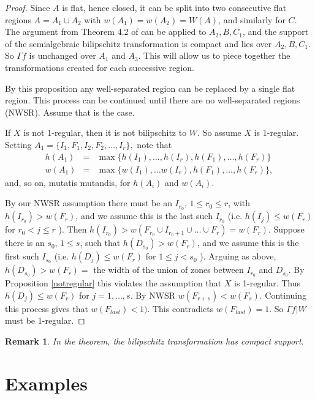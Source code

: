 \documentclass[article]{amsart}
\newtheorem{remark}[theorem]{Remark}
\newcommand{\0}{{\bf 0}}
\begin{document}
\begin{proof}
Since $A$ is flat, hence closed, it can be split into two consecutive flat regions $A=A_1\cup A_2$ with $w(A_1)=w(A_2)=W(A)$, and similarly for $C$. The argument from Theorem 4.2 of \cite{OW1} can be applied to $A_2,B,C_1$, 
and the support of the semialgebraic bilipschitz transformation is compact and lies over $A_2,B,C_1$.  So $\Gamma f$ is unchanged over $A_1$ and $A_3$.  This will allow us to piece together the transformations created for each successive region.


By this proposition any well-separated region can be replaced by a single flat region.  This process can be continued until  there are no well-separated regions (NWSR).  Assume that is the case.

If $X$ is  not 1-regular, then it is not bilipschitz to $W$.  So assume $X$ is 1-regular.  
Setting $A_1 = \{ I_1, F_1, I_2, F_2, \ldots, I_r\},$ note that 
\begin{eqnarray*}
h(A_1) &=& \max\{h(I_1), \ldots, h(I_r), h(F_1), \ldots, h(F_r)\}\\
w(A_1) &=& \max\{w(I_1), \ldots w(I_r), h(F_1), \ldots, h(F_r)\},
\end{eqnarray*} 
and, so on, mutatis mutandis, for $h(A_i)$ and $w(A_i)$.  

By our NWSR assumption there must be an  $I_{r_0}$, $1\le {r_0}\le r$, 
with $h(I_{r_0})>w(F_r)$, and we assume this is the last such $I_{r_0}$ 
(i.e. $h(I_j)\le w(F_r)$ for ${r_0}<j\le r$ ).   Then $h(I_{r_0})> w(F_{r_0}\cup I_{{r_0}+1}\cup \dots \cup F_r)=w(F_r)$. 
Suppose there is an $s_0$, $1\le {s}$, such that   
 $h(D_{s_0})>w(F_r)$, and we assume this is the first such $I_{s_0}$ 
 (i.e. $h(D_j)\le w(F_r)$ for $1\le j <s_0$ ).  Arguing as above, 
 $h(D_{s_0})> w(F_r)=$ the width of the union of zones between 
 $I_{r_0}$ and $D_{s_0}$.  By  Proposition \ref{notregular} 
 this violates the assumption that $X$ is 1-regular.  
 Thus  $h(D_j)\le w(F_r)$ for $j=1, \ldots, s$. 
 By NWSR $w(F_{r+s})< w(F_s)$.   
Continuing this process gives that $w(F_{last})<1)$.  
This contradicts $w(F_{last})=1$. So $\Gamma f|W$ must be 1-regular.
\end{proof} 

\begin{remark} In the theorem, the bilipschitz transformation has compact support. \end{remark}

\section{Examples}
\end{document}
